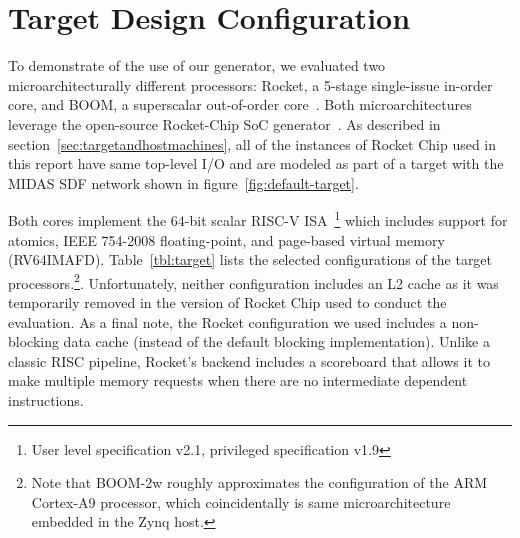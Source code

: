 \section{Target Design Configuration}

To demonstrate of the use of our generator, we evaluated two
microarchitecturally different processors:  Rocket, a 5-stage single-issue
in-order core, and BOOM, a superscalar out-of-order core~\cite{boom}. Both
microarchitectures leverage the open-source Rocket-Chip SoC
generator~\cite{rocketchip}. As described in section~\ref{sec:targetandhostmachines}, all of the instances of Rocket Chip used in
this report have same top-level I/O and are modeled as part of a target with
the MIDAS SDF network shown in figure~\ref{fig:default-target}.

Both cores implement the 64-bit scalar RISC-V ISA~\cite{Waterman:EECS-2016-118,
Waterman:EECS-2016-161}\footnote{User level specification v2.1, privileged
specification v1.9} which includes support for atomics, IEEE 754-2008
floating-point, and page-based virtual memory (RV64IMAFD).
Table~\ref{tbl:target} lists the selected configurations of the target
processors.\footnote{Note that BOOM-2w roughly approximates the configuration
of the ARM Cortex-A9 processor, which coincidentally is same microarchitecture
embedded in the Zynq host.}. Unfortunately, neither configuration includes an
L2 cache as it was  temporarily removed in the version of Rocket Chip used to
conduct the evaluation. As a final note, the Rocket configuration we used
includes a non-blocking data cache (instead of the default blocking
implementation). Unlike a classic RISC pipeline, Rocket's backend includes a
scoreboard that allows it to make multiple memory requests when there are no
intermediate dependent instructions.

\begin{table}
\begin{center}
\end{center}
\caption{Processor Parameters}
\label{tbl:target}
\end{table}%

